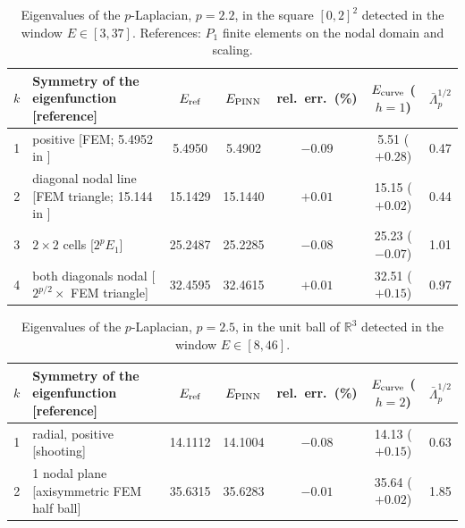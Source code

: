 \begin{table}[ht]
\centering
\begin{tabular}{clccccc}
\toprule
$k$ & Symmetry of the eigenfunction [reference] & $E_{\rm ref}$ & $E_{\rm PINN}$ & rel.\ err.\ (\%) & $E_{\rm curve}$ ($h=1$) & $\bar\Lambda_p^{1/2}$ \\
\midrule
1 & positive [FEM; 5.4952 in \cite{HJ11}] & 5.4950 & 5.4902 & $-0.09$ & 5.51 ($+0.28$) & 0.47 \\
2 & diagonal nodal line [FEM triangle; 15.144 in \cite{HJ11}] & 15.1429 & 15.1440 & $+0.01$ & 15.15 ($+0.02$) & 0.44 \\
3 & $2\times2$ cells [$2^{p}E_1$] & 25.2487 & 25.2285 & $-0.08$ & 25.23 ($-0.07$) & 1.01 \\
4 & both diagonals nodal [$2^{p/2}\times$ FEM triangle] & 32.4595 & 32.4615 & $+0.01$ & 32.51 ($+0.15$) & 0.97 \\
\bottomrule
\end{tabular}
\caption{Eigenvalues of the $p$-Laplacian, $p=2.2$, in the square $[0,2]^2$ detected in the window $E\in[3,37]$. References: $P_1$ finite elements on the nodal domain and scaling.}
\label{tab.plap.square}
\end{table}

\begin{table}[ht]
\centering
\begin{tabular}{clccccc}
\toprule
$k$ & Symmetry of the eigenfunction [reference] & $E_{\rm ref}$ & $E_{\rm PINN}$ & rel.\ err.\ (\%) & $E_{\rm curve}$ ($h=2$) & $\bar\Lambda_p^{1/2}$ \\
\midrule
1 & radial, positive [shooting] & 14.1112 & 14.1004 & $-0.08$ & 14.13 ($+0.15$) & 0.63 \\
2 & 1 nodal plane [axisymmetric FEM half ball] & 35.6315 & 35.6283 & $-0.01$ & 35.64 ($+0.02$) & 1.85 \\
\bottomrule
\end{tabular}
\caption{Eigenvalues of the $p$-Laplacian, $p=2.5$, in the unit ball of $\mathbb R^3$ detected in the window $E\in[8,46]$.}
\label{tab.plap.ball}
\end{table}

